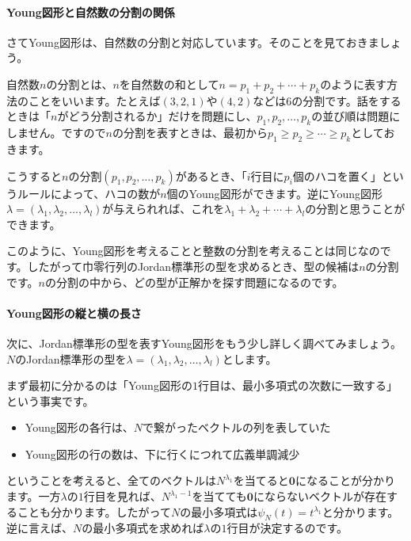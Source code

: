 \paragraph{Young図形と自然数の分割の関係}

さてYoung図形は、自然数の分割と対応しています。そのことを見ておきましょう。

自然数$n$の分割とは、$n$を自然数の和として$n = p_1 + p_2 + \cdots + p_k$のように表す方法のことをいいます。たとえば$(3, 2, 1)$や$(4, 2)$などは$6$の分割です。話をするときは「$n$がどう分割されるか」だけを問題にし、$p_1, p_2, \ldots, p_k$の並び順は問題にしません。ですので$n$の分割を表すときは、最初から$p_1 \geq p_2 \geq \cdots \geq p_k$としておきます。

こうすると$n$の分割$(p_1, p_2, \ldots, p_k)$があるとき、「$i$行目に$p_i$個のハコを置く」というルールによって、ハコの数が$n$個のYoung図形ができます。逆にYoung図形$\lambda = (\lambda_1, \lambda_2, \ldots, \lambda_l)$が与えられれば、これを$\lambda_1 + \lambda_2 + \cdots + \lambda_l$の分割と思うことができます。

このように、Young図形を考えることと整数の分割を考えることは同じなのです。したがって巾零行列のJordan標準形の型を求めるとき、型の候補は$n$の分割です。$n$の分割の中から、どの型が正解かを探す問題になるのです。

\paragraph{Young図形の縦と横の長さ}

次に、Jordan標準形の型を表すYoung図形をもう少し詳しく調べてみましょう。$N$のJordan標準形の型を$\lambda = (\lambda_1, \lambda_2, \ldots, \lambda_l)$とします。

まず最初に分かるのは「Young図形の$1$行目は、最小多項式の次数に一致する」という事実です。
\begin{itemize}
\item Young図形の各行は、$N$で繋がったベクトルの列を表していた
\item Young図形の行の数は、下に行くにつれて広義単調減少
\end{itemize}
ということを考えると、全てのベクトルは$N^{\lambda_1}$を当てると$\bm{0}$になることが分かります。一方$\lambda$の$1$行目を見れば、$N^{\lambda_1 - 1}$を当てても$\bm{0}$にならないベクトルが存在することも分かります。したがって$N$の最小多項式は$\psi_N(t) = t^{\lambda_1}$と分かります。逆に言えば、$N$の最小多項式を求めれば$\lambda$の$1$行目が決定するのです。

